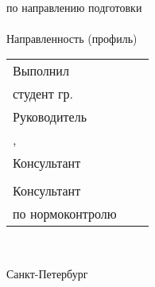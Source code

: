 {\centering%
	
	\MakeUppercase{\bfseries{}\DocType} \\
	\thesisDegree
	\vspace*{1mm}%


{\centering%
	\MakeUppercase{\bfseries{\thesisTitle}}}%

}\par%

\vspace*{-1mm}
\begin{center}
\noindent	по направлению подготовки \\
\noindent \thesisSpecialtyCodeAndTitle{}\\%
\vspace*{3mm}
\noindent	Направленность (профиль) \\
\noindent \thesisOPCodeAndTitle %
\end{center}
\par%


\vspace{4mm plus2fill}%
\vspace*{0.5mm}

\noindent
\begin{tabularx}{0.98\linewidth}{lXl}
	Выполнил              &	   &             \\
	студент гр.~\group     &    & \Author     \\[\mfloatsep]

	Руководитель 		  &    &             \\
	\SupervisorJob,	\SupervisorDegree	  &    & \Supervisor \\[\mfloatsep]
	 	  
	
	Консультант		  &    & 			 \\
	\ConsultantExtraDegree 	  &    & \ConsultantExtra\\[\mfloatsep]
	
	Консультант  &    &  \\   	
	по нормоконтролю  		 	  &    & \ConsultantNorm  %
\end{tabularx} %


%
\vspace{0pt plus4fill}%

\ \\
\begin{center}%
Санкт-Петербург\\
\thesisYear
\end{center}%
\restoregeometry
\newpage